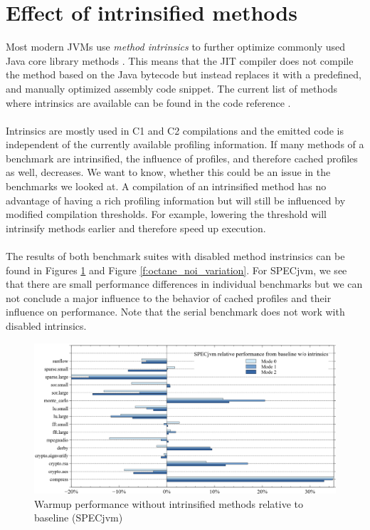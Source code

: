 \section{Effect of intrinsified methods}
\label{s:perf_intrinsics}
Most modern JVMs use \textit{method intrinsics} to further optimize commonly used Java core library methods \cite{intrinsics_talk}.
This means that the JIT compiler does not compile the method based on the Java bytecode but instead replaces it with a predefined, and manually optimized assembly code snippet. The current list of methods where intrinsics are available can be found in the code reference \cite{code_intrinsics}.
\\\\
Intrinsics are mostly used in C1 and C2 compilations and the emitted code is independent of the currently available profiling information.
If many methods of a benchmark are intrinsified, the influence of profiles, and therefore cached profiles as well, decreases.
We want to know, whether this could be an issue in the benchmarks we looked at. A compilation of an intrinsified method has no advantage of having a rich profiling information but will still be influenced by modified compilation thresholds. For example, lowering the threshold will intrinsify methods earlier and therefore speed up execution.
\\\\
The results of both benchmark suites with disabled method instrinsics can be found in Figures \ref{f:all_warmup_noi_variation} and Figure \ref{f:octane_noi_variation}.
For SPECjvm, we see that there are small performance differences in individual benchmarks but we can not conclude a major influence to the behavior of cached profiles and their influence on performance. Note that the serial benchmark does not work with disabled intrinsics.
\begin{figure}[ht]
  \begin{center}
    \centering
    \includegraphics[width=1.0\textwidth]{figures/all_warmup_noi_variation.png}
    \caption{Warmup performance without intrinsified methods relative to baseline (SPECjvm)}
    \label{f:all_warmup_noi_variation}
  \end{center}
\end{figure}
